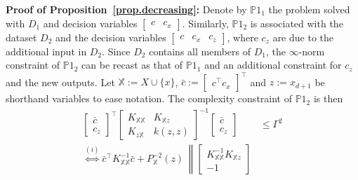 \begin{my_proof}
	\textbf{Proof of Proposition~\ref{prop.decreasing}:}
	Denote by $\mathds{P}1_1$ the problem solved with $D_1$ and decision variables $\begin{bmatrix} c & c_x \end{bmatrix}$. Similarly, $\mathds{P}1_2$ is associated with the dataset $D_2$ and the decision variables $\begin{bmatrix} c & c_x & c_z \end{bmatrix}$, where $c_z$ are due to the additional input in $D_2$. Since $D_2$ contains all members of $D_1$, the $\infty$-norm constraint of $\mathds{P}1_2$ can be recast as that of $\mathds{P}1_1$ and an additional constraint for $c_z$ and the new outputs. Let $\mathds{X}  := X \cup \{x\}$, $\bar c := \begin{bmatrix} c^\top c_x \end{bmatrix}^\top$ and $z := x_{d+1}$ be shorthand variables to ease notation. The complexity constraint of $\mathds{P}1_2$ is then
	\begin{subequations}
		\begin{align}
			\begin{bmatrix}
				\bar c \\
				c_z
			\end{bmatrix}^\top 
			\begin{bmatrix}
				K_{\mathds{X} \mathds{X} } & K_{\mathds{X}  z} \\
				K_{z \mathds{X} } & k(z,z)
			\end{bmatrix}^{-1} 
			\begin{bmatrix}
				\bar c \\
				c_z
			\end{bmatrix} & \leq \Gamma^2 \\
			\overset{(i)}{\Leftrightarrow}
			\bar c^\top K_{\mathds{X} \mathds{X} }^{-1} \bar c +
			P_{\mathds{X} }^{-2}(z) \, 
			\left\|
			\begin{bmatrix}
				K_{\mathds{X} \mathds{X} }^{-1} K_{\mathds{X} z} \\
				-1
			\end{bmatrix}

\end{align}
\end{subequations}
\end{my_proof}
